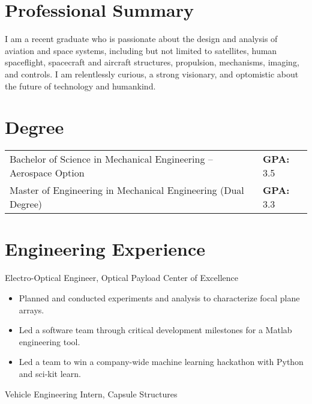 \documentclass[10pt,final,sans]{resume}
\begin{document}
\setlength\headheight{28pt} %

\section{Professional Summary}
I am a recent graduate who is passionate about the design and analysis of
aviation and space systems, including but not limited to satellites, human
spaceflight, spacecraft and aircraft structures, propulsion, mechanisms,
imaging, and controls. I am relentlessly curious, a strong visionary, and
optomistic about the future of technology and humankind.

\section{Degree}
\begin{tabular}{ll}
Bachelor of Science in Mechanical Engineering -- Aerospace Option & {\bf GPA: } 3.5 \\
Master of Engineering in Mechanical Engineering (Dual Degree) & {\bf GPA: } 3.3 \\
\end{tabular}

\section{Engineering Experience}
Electro-Optical Engineer, Optical Payload Center of Excellence
\begin{itemize}
  \item Planned and conducted experiments and analysis to characterize focal plane arrays.
  \item Led a software team through critical development milestones for a Matlab engineering tool. 
  \item Led a team to win a company-wide machine learning hackathon with Python and sci-kit learn.
\end{itemize} 
Vehicle Engineering Intern, Capsule Structures
\end{document}
